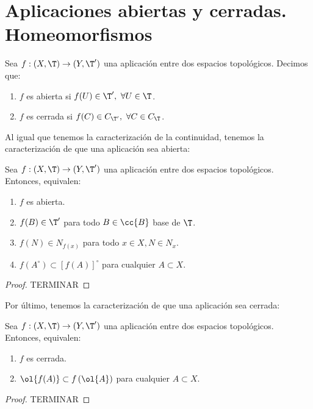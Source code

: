 \section{Aplicaciones abiertas y cerradas. Homeomorfismos}

\begin{definicion}
    Sea $f:(X,\T)\to (Y,\T')$ una aplicación entre dos espacios topológicos. Decimos que:
    \begin{enumerate}
        \item $f$ es abierta si $f(U)\in \T',~ \forall U\in \T$.
        \item $f$ es cerrada si $f(C)\in C_{\T'},~ \forall C\in C_\T$.
    \end{enumerate}
\end{definicion}

Al igual que tenemos la caracterización de la continuidad, tenemos la caracterización de que una aplicación sea abierta:
\begin{lema}
    Sea $f:(X,\T)\to (Y,\T')$ una aplicación entre dos espacios topológicos. Entonces, equivalen:
    \begin{enumerate}
        \item $f$ es abierta.
        \item $f(B)\in \T'$ para todo $B\in \cc{B}$ base de $\T$.
        \item $f(N)\in N_{f(x)}$ para todo $x\in X, N\in N_x$.
        \item $f(A^\circ)\subset [f(A)]^\circ$ para cualquier $A\subset X$.
    \end{enumerate}
\end{lema}
\begin{proof}
    TERMINAR
\end{proof}

Por último, tenemos la caracterización de que una aplicación sea cerrada:
\begin{lema}
    Sea $f:(X,\T)\to (Y,\T')$ una aplicación entre dos espacios topológicos. Entonces, equivalen:
    \begin{enumerate}
        \item $f$ es cerrada.
        \item $\ol{f(A)}\subset f\left(\ol{A}\right)$ para cualquier $A\subset X$.
    \end{enumerate}
\end{lema}
\begin{proof}
    TERMINAR
\end{proof}


